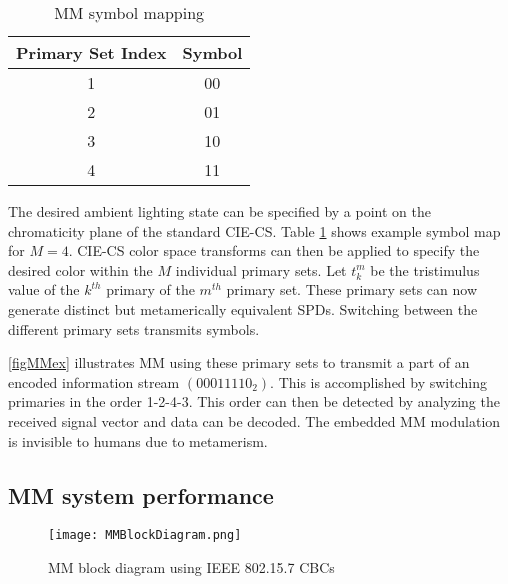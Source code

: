 \begin{table}[!t]
	\centering
		\begin{tabular}{|c|c|}
		\hline
		{Primary Set Index} & {Symbol}\\
		\hline
		1 & 00\\
		2 & 01\\
		3 & 10\\
		4 & 11\\
		\hline
		\end{tabular}
	\caption{MM symbol mapping}
	\label{tblMMSymbol}
\end{table}

The desired ambient lighting state can be specified by a point on the chromaticity plane of the standard CIE-CS. Table \ref{tblMMSymbol} shows example symbol map for $M=4$. CIE-CS color space transforms can then be applied to specify the desired color within the $M$ individual primary sets. Let $t_{k}^{m}$ be the tristimulus value of the $k^{th}$ primary of the $m^{th}$ primary set. These primary sets can now generate distinct but metamerically equivalent SPDs. Switching between the different primary sets transmits symbols.

\figurename{ \ref{figMMex}} illustrates MM using these primary sets to transmit a part of an encoded information stream $(00011110_{2})$. This is accomplished by switching primaries in the order 1-2-4-3. This order can then be detected by analyzing the received signal vector and data can be decoded. The embedded MM modulation is invisible to humans due to metamerism.
\subsection{MM system performance}
\label{subsec:metamericPerformance}

\begin{figure}[t]
	\centering
    \texttt{[image: MMBlockDiagram.png]}
	\caption{MM block diagram using IEEE 802.15.7 CBCs}
	\label{figMMBD}
\end{figure}


